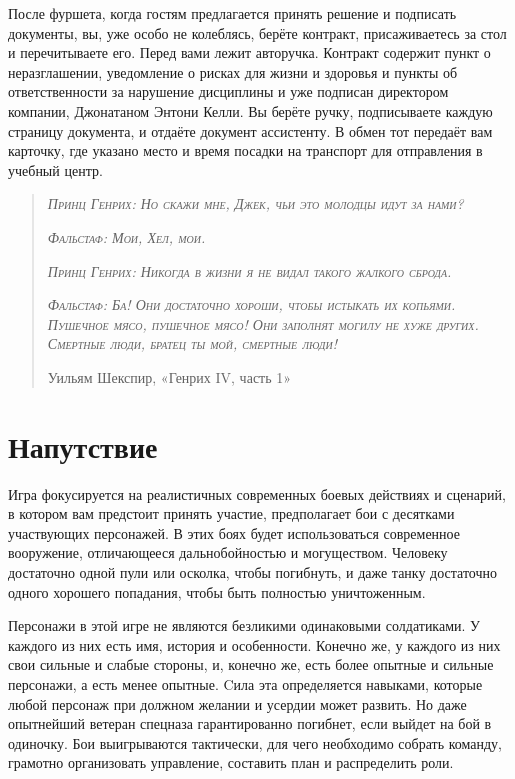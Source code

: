 \documentclass[
]{article}
\begin{document}
После фуршета, когда гостям предлагается принять решение и подписать
документы, вы, уже особо не колеблясь, берёте контракт, присаживаетесь
за стол и перечитываете его. Перед вами лежит авторучка. Контракт
содержит пункт о неразглашении, уведомление о рисках для жизни и
здоровья и пункты об ответственности за нарушение дисциплины и уже
подписан директором компании, Джонатаном Энтони Келли. Вы берёте ручку,
подписываете каждую страницу документа, и отдаёте документ ассистенту. В
обмен тот передаёт вам карточку, где указано место и время посадки на
транспорт для отправления в учебный центр.

\begin{quote}
\emph{\textsc{Принц Генрих: Но скажи мне, Джек, чьи это молодцы идут за
нами?}}

\emph{\textsc{Фальстаф: Мои, Хел, мои.}}

\emph{\textsc{Принц Генрих: Никогда в жизни я не видал такого жалкого
сброда.}}

\emph{\textsc{Фальстаф: Ба! Они достаточно хороши, чтобы истыкать их
копьями. Пушечное мясо, пушечное мясо! Они заполнят могилу не хуже
других. Смертные люди, братец ты мой, смертные люди!}}

Уильям Шекспир, «Генрих IV, часть 1»
\end{quote}

\section{Напутствие}\label{ux43dux430ux43fux443ux442ux441ux442ux432ux438ux435}

Игра фокусируется на реалистичных современных боевых действиях и
сценарий, в котором вам предстоит принять участие, предполагает бои с
десятками участвующих персонажей. В этих боях будет использоваться
современное вооружение, отличающееся дальнобойностью и могуществом.
Человеку достаточно одной пули или осколка, чтобы погибнуть, и даже
танку достаточно одного хорошего попадания, чтобы быть полностью
уничтоженным.

Персонажи в этой игре не являются безликими одинаковыми солдатиками. У
каждого из них есть имя, история и особенности. Конечно же, у каждого из
них свои сильные и слабые стороны, и, конечно же, есть более опытные и
сильные персонажи, а есть менее опытные. Cила эта определяется навыками,
которые любой персонаж при должном желании и усердии может развить. Но
даже опытнейший ветеран спецназа гарантированно погибнет, если выйдет на
бой в одиночку. Бои выигрываются тактически, для чего необходимо собрать
команду, грамотно организовать управление, составить план и распределить
роли.
\end{document}
